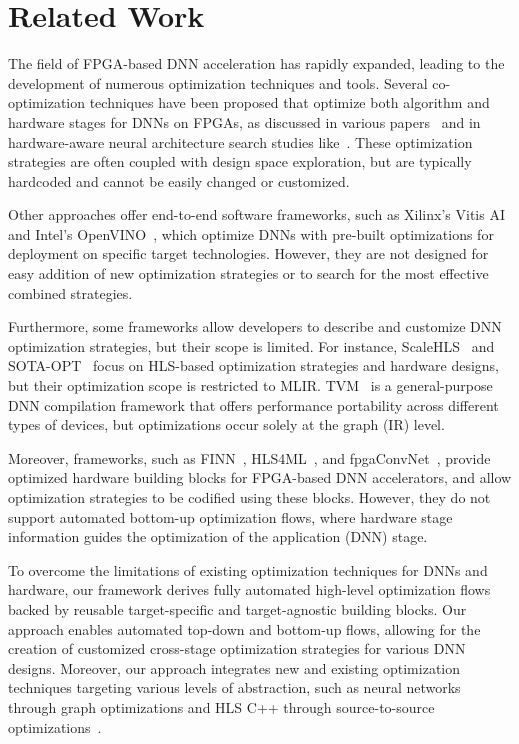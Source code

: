


\section{Related Work}\label{sec:related_work}

The field of FPGA-based DNN acceleration has rapidly expanded, leading to the development of numerous optimization techniques and tools. 
Several co-optimization techniques have been proposed that optimize both algorithm and hardware stages for DNNs on FPGAs, as discussed in various papers~\cite{yang2019synetgy, zhang2022algorithm, hao2018deep, hao2019fpga, hao2019nais,  hao2020effective, jiang2020hardware, dong2021hao, hao2021enabling} and in hardware-aware neural architecture search studies like~\cite{ney2021half, abdelfattah2020best}. These optimization strategies are often coupled with design space exploration, but are typically hardcoded and cannot be easily changed or customized.

Other approaches offer end-to-end software frameworks, such as Xilinx's Vitis AI~\cite{kathail2020xilinx} and Intel's OpenVINO~\cite{OpenVINO2023},  which optimize DNNs with pre-built optimizations for deployment on specific target technologies. However, they are not designed for easy addition of new optimization strategies or to search for the most effective combined strategies.

Furthermore, some frameworks allow developers to describe and customize DNN optimization strategies, but their scope is limited. For instance, ScaleHLS~\cite{ye2022scalehls} and SOTA-OPT~\cite{agostini2022mlir} focus on HLS-based optimization strategies and hardware designs, but their optimization scope is restricted to MLIR. TVM~\cite{chen2018tvm} is a general-purpose DNN compilation framework that offers performance portability across different types of devices, but optimizations occur solely at the graph (IR) level.

Moreover, frameworks, such as FINN~\cite{umuroglu2017finn}, HLS4ML~\cite{duarte2018fast}, and fpgaConvNet~\cite{venieris2016fpgaconvnet}, provide optimized hardware building blocks for FPGA-based DNN accelerators, and allow optimization strategies to be codified using these blocks. However, they do not support automated bottom-up optimization flows, where hardware stage information guides the optimization of the application (DNN) stage.

To overcome the limitations of existing optimization techniques for DNNs and hardware, our framework derives fully automated high-level optimization flows backed by reusable target-specific and target-agnostic building blocks. Our approach enables automated top-down and bottom-up flows, allowing for the creation of customized cross-stage optimization strategies for various DNN designs. Moreover, our approach integrates new and existing optimization techniques targeting various levels of abstraction, such as neural networks through graph optimizations and HLS C++ through source-to-source optimizations~\cite{fccm20_artisan}.
